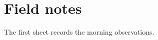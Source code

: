 \documentclass{myjournal}
\begin{document}
\section{Field notes}
The first sheet records the morning observations.
\end{document}
